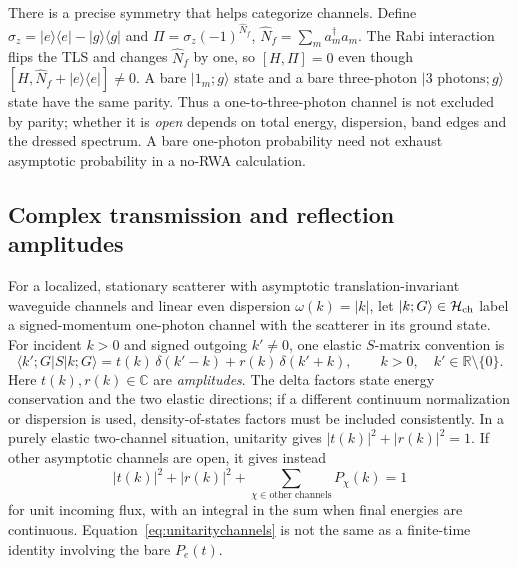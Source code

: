 \documentclass[11pt,a4paper]{article}
\newcommand{\ket}[1]{\lvert #1\rangle}
\newcommand{\bra}[1]{\langle #1\rvert}
\newcommand{\HH}{\mathcal H}
\begin{document}
There is a precise symmetry that helps categorize channels. Define $\sigma_z=\ket e\bra e-\ket g\bra g$ and $\Pi=\sigma_z(-1)^{\hat N_f}$, $\hat N_f=\sum_m a_m^\dagger a_m$. The Rabi interaction flips the TLS and changes $\hat N_f$ by one, so $[H,\Pi]=0$ even though $[H,\hat N_f+\ket e\bra e]\ne0$. A bare $\ket{1_m;g}$ state and a bare three-photon $\ket{3\text{ photons};g}$ state have the same parity. Thus a one-to-three-photon channel is not excluded by parity; whether it is \emph{open} depends on total energy, dispersion, band edges and the dressed spectrum. A bare one-photon probability need not exhaust asymptotic probability in a no-RWA calculation.

\subsection{Complex transmission and reflection amplitudes}
For a localized, stationary scatterer with asymptotic translation-invariant waveguide channels and linear even dispersion $\omega(k)=|k|$, let $\ket{k;G}\in\HH_{\rm ch}$ label a signed-momentum one-photon channel with the scatterer in its ground state. For incident $k>0$ and signed outgoing $k'\ne0$, one elastic $S$-matrix convention is
\begin{equation}
 \bra{k';G}S\ket{k;G}
 =t(k)\,\delta(k'-k)+r(k)\,\delta(k'+k),
 \qquad k>0,\quad k'\in\mathbb R\setminus\{0\}.
 \label{eq:tramp}
\end{equation}
Here $t(k),r(k)\in\mathbb C$ are \emph{amplitudes}. The delta factors state energy conservation and the two elastic directions; if a different continuum normalization or dispersion is used, density-of-states factors must be included consistently. In a purely elastic two-channel situation, unitarity gives $|t(k)|^2+|r(k)|^2=1$. If other asymptotic channels are open, it gives instead
\begin{equation}
 |t(k)|^2+|r(k)|^2+\sum_{\chi\in\text{other channels}}P_\chi(k)=1
 \label{eq:unitaritychannels}
\end{equation}
for unit incoming flux, with an integral in the sum when final energies are continuous. Equation~\eqref{eq:unitaritychannels} is not the same as a finite-time identity involving the bare $P_e(t)$.
\end{document}
